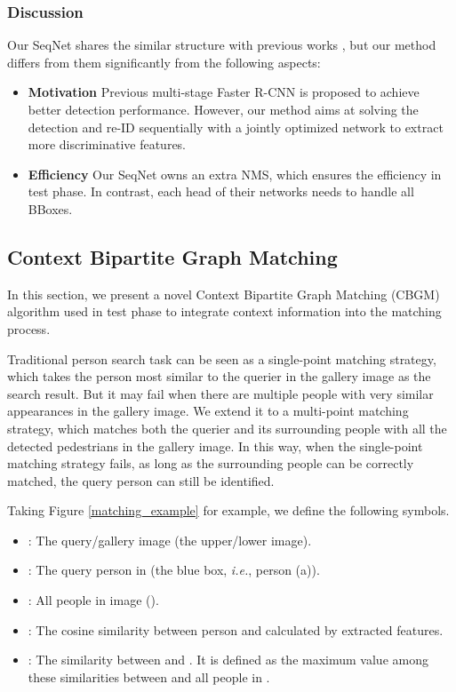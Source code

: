 \documentclass[letterpaper]{article} \usepackage{aaai21}  \usepackage{times}  \usepackage{helvet} \usepackage{courier}  \usepackage[hyphens]{url}  \usepackage{graphicx} \urlstyle{rm} \def\UrlFont{\rm}  \usepackage{natbib}  \usepackage{caption} \usepackage{multirow}
\begin{document}
\subsubsection{Discussion}
Our SeqNet shares the similar structure with previous works \cite{iterative-bbox1,iterative-bbox2,cascade-rcnn}, but our method differs from them significantly from the following aspects:

\begin{itemize}
    \item \textbf{Motivation} Previous multi-stage Faster R-CNN is proposed to achieve better detection performance. However, our method aims at solving the detection and re-ID sequentially with a jointly optimized network to extract more discriminative features.
    \item \textbf{Efficiency} Our SeqNet owns an extra NMS, which ensures the efficiency in test phase. In contrast, each head of their networks needs to handle all BBoxes.
\end{itemize}

\subsection{Context Bipartite Graph Matching}
In this section, we present a novel Context Bipartite Graph Matching (CBGM) algorithm used in test phase to integrate context information into the matching process.

Traditional person search task can be seen as a single-point matching strategy, which takes the person most similar to the querier in the gallery image as the search result. But it may fail when there are multiple people with very similar appearances in the gallery image. We extend it to a multi-point matching strategy, which matches both the querier and its surrounding people with all the detected pedestrians in the gallery image. In this way, when the single-point matching strategy fails, as long as the surrounding people can be correctly matched, the query person can still be identified.

Taking Figure \ref{matching_example} for example, we define the following symbols.
\begin{itemize}
    \item : The query/gallery image (the upper/lower image).
    \item : The query person in  (the blue box, \textit{i.e.}, person (a)).
    \item : All people in image ().
    \item : The cosine similarity between person  and  calculated by extracted features.
    \item : The similarity between  and . It is defined as the maximum value among these similarities between  and all people in .
    
\end{itemize}
\end{document}
